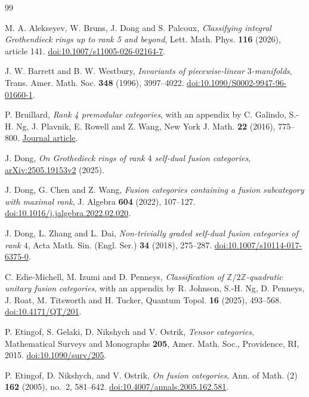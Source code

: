 \documentclass[11pt]{amsart}
\theoremstyle{definition}
\numberwithin{equation}{section}
\begin{document}
\raggedbottom
\begin{thebibliography}{99}

M. A. Alekseyev, W. Bruns, J. Dong and S. Palcoux,
\emph{Classifying integral Grothendieck rings up to rank 5 and beyond},
Lett. Math. Phys. \textbf{116} (2026), article 141.
\href{https://doi.org/10.1007/s11005-026-02164-7}{doi:10.1007/s11005-026-02164-7}.


J. W. Barrett and B. W. Westbury,
\emph{Invariants of piecewise-linear $3$-manifolds},
Trans. Amer. Math. Soc. \textbf{348} (1996), 3997--4022.
\href{https://doi.org/10.1090/S0002-9947-96-01660-1}{doi:10.1090/S0002-9947-96-01660-1}.

P. Bruillard,
\emph{Rank 4 premodular categories}, with an appendix by C. Galindo,
S.-H. Ng, J. Plavnik, E. Rowell and Z. Wang,
New York J. Math. \textbf{22} (2016), 775--800.
\href{https://nyjm.albany.edu/j/2016/22-36.html}{Journal article}.

J. Dong,
\emph{On Grothedieck rings of rank $4$ self-dual fusion categories},
\href{https://arxiv.org/abs/2505.19153v2}{arXiv:2505.19153v2} (2025).

J. Dong, G. Chen and Z. Wang,
\emph{Fusion categories containing a fusion subcategory with maximal rank},
J. Algebra \textbf{604} (2022), 107--127.
\href{https://doi.org/10.1016/j.jalgebra.2022.02.020}{doi:10.1016/j.jalgebra.2022.02.020}.

J. Dong, L. Zhang and L. Dai,
\emph{Non-trivially graded self-dual fusion categories of rank $4$},
Acta Math. Sin. (Engl. Ser.) \textbf{34} (2018), 275--287.
\href{https://doi.org/10.1007/s10114-017-6375-0}{doi:10.1007/s10114-017-6375-0}.

C. Edie-Michell, M. Izumi and D. Penneys,
\emph{Classification of $\mathbb Z/2\mathbb Z$-quadratic unitary fusion categories},
with an appendix by R. Johnson, S.-H. Ng, D. Penneys, J. Roat, M. Titsworth and H. Tucker,
Quantum Topol. \textbf{16} (2025), 493--568.
\href{https://doi.org/10.4171/QT/201}{doi:10.4171/QT/201}.

P. Etingof, S. Gelaki, D. Nikshych and V. Ostrik,
\emph{Tensor categories},
Mathematical Surveys and Monographs \textbf{205},
Amer. Math. Soc., Providence, RI, 2015.
\href{https://doi.org/10.1090/surv/205}{doi:10.1090/surv/205}.

P. Etingof, D. Nikshych, and V. Ostrik,
\emph{On fusion categories},
Ann. of Math. (2) \textbf{162} (2005), no.~2, 581--642.
\href{https://doi.org/10.4007/annals.2005.162.581}{doi:10.4007/annals.2005.162.581}.


\end{thebibliography}
\end{document}
